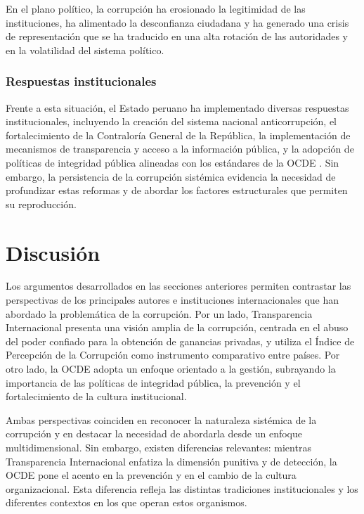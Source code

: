 \documentclass[12pt,a4paper]{article}
\begin{document}
En el plano político, la corrupción ha erosionado la legitimidad de las instituciones, ha alimentado la desconfianza ciudadana y ha generado una crisis de representación que se ha traducido en una alta rotación de las autoridades y en la volatilidad del sistema político.

\subsubsection{Respuestas institucionales}

Frente a esta situación, el Estado peruano ha implementado diversas respuestas institucionales, incluyendo la creación del sistema nacional anticorrupción, el fortalecimiento de la Contraloría General de la República, la implementación de mecanismos de transparencia y acceso a la información pública, y la adopción de políticas de integridad pública alineadas con los estándares de la OCDE \parencite{ocde2020}. Sin embargo, la persistencia de la corrupción sistémica evidencia la necesidad de profundizar estas reformas y de abordar los factores estructurales que permiten su reproducción.

\section{Discusión}

Los argumentos desarrollados en las secciones anteriores permiten contrastar las perspectivas de los principales autores e instituciones internacionales que han abordado la problemática de la corrupción. Por un lado, Transparencia Internacional \parencite{transparencia2023} presenta una visión amplia de la corrupción, centrada en el abuso del poder confiado para la obtención de ganancias privadas, y utiliza el Índice de Percepción de la Corrupción como instrumento comparativo entre países. Por otro lado, la OCDE \parencite{ocde2020} adopta un enfoque orientado a la gestión, subrayando la importancia de las políticas de integridad pública, la prevención y el fortalecimiento de la cultura institucional.

Ambas perspectivas coinciden en reconocer la naturaleza sistémica de la corrupción y en destacar la necesidad de abordarla desde un enfoque multidimensional. Sin embargo, existen diferencias relevantes: mientras Transparencia Internacional enfatiza la dimensión punitiva y de detección, la OCDE pone el acento en la prevención y en el cambio de la cultura organizacional. Esta diferencia refleja las distintas tradiciones institucionales y los diferentes contextos en los que operan estos organismos.
\end{document}
